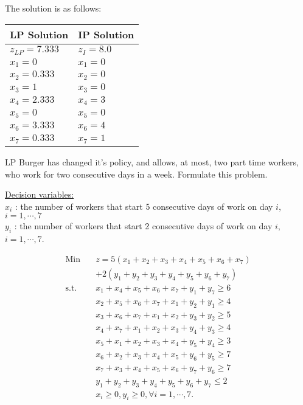 The solution is as follows:
\begin{table}[h!] \begin{center} \begin{tabular} {|l|l|}
\hline   LP Solution        & IP Solution \\
\hline  $z_{LP} = 7.333$    & $z_I = 8.0$ \\
\hline  $x_1 = 0$           & $x_1 = 0$ \\
\hline  $x_2 = 0.333$       & $x_2 = 0 $ \\
\hline  $x_3 = 1$           & $x_3 = 0$ \\
\hline  $x_4 = 2.333$       & $x_4 = 3$ \\
\hline  $x_5 = 0$           & $x_5 = 0 $ \\
\hline  $x_6 = 3.333$       & $x_6 = 4 $ \\
\hline  $x_7 = 0.333$       & $x_7 = 1 $ \\
\hline
\end{tabular} \end{center} \end{table}

\medskip  LP Burger has changed it's policy, and allows, at most, two part time workers, who work for two consecutive days in a week.  Formulate this problem.

\underline{Decision variables:} \\
$x_i$ : the number of workers that start 5 consecutive days of work on day $i$, $ i = 1,\cdots,7$ \\
$y_i$ : the number of workers that start 2 consecutive days of work on day $i$, $ i = 1,\cdots,7$.

\begin{align*}
\mbox{Min~~ } & z = 5(x_1 + x_2 + x_3 + x_4 + x_5 + x_6 + x_7) \\
& + 2(y_1 + y_2 + y_3 + y_4 + y_5 + y_6 + y_7) \nonumber \\
\mbox{s.t.~~} & x_1 + x_4 + x_5 + x_6 + x_7 + y_1 + y_7 \ge 6 \\
& x_2 + x_5 + x_6 + x_7 + x_1 + y_2 + y_1 \ge 4 \\
&           x_3 + x_6 + x_7 + x_1 + x_2 + y_3 + y_2 \ge 5 \\
&           x_4 + x_7 + x_1 + x_2 + x_3 + y_4 + y_3 \ge 4 \\
&           x_5 + x_1 + x_2 + x_3 + x_4 + y_5 + y_4 \ge 3 \\
&           x_6 + x_2 + x_3 + x_4 + x_5 + y_6 + y_5 \ge 7 \\
&           x_7 + x_3 + x_4 + x_5 + x_6 + y_7 + y_6 \ge 7 \\
&           y_1 + y_2 + y_3 + y_4 + y_5 + y_6 + y_7 \le 2 \\
&           x_i \ge 0, y_i \ge 0, \forall i = 1,\cdots,7.
\end{align*}

